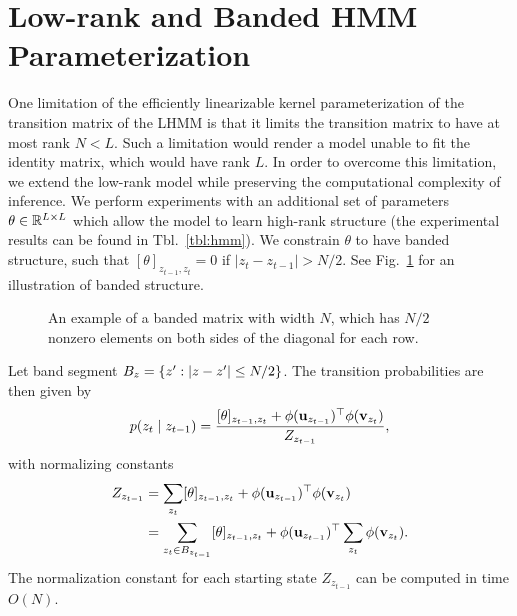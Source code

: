 \documentclass{article}
\begin{document}
\section{Low-rank and Banded HMM Parameterization}
\label{sec:banded}
One limitation of the efficiently linearizable kernel parameterization of the transition matrix of the LHMM is that it limits the transition matrix to have at most rank $N < L$. Such a limitation would render a model unable to fit the identity matrix, which would have rank $L$. 
In order to overcome this limitation, we extend the low-rank model while preserving the computational complexity of inference.
We perform experiments with an additional set of parameters $\theta \in\mathbb{R}^{L\times L}$ which allow the model to learn high-rank structure (the experimental results can be found in Tbl.~\ref{tbl:hmm}).
We constrain $\theta$ to have banded structure,
such that $[\theta]_{z_{t-1},z_t} = 0$ if $|z_t - z_{t-1}| > N/2$.
See Fig.~\ref{fig:banded} for an illustration of banded structure.
\begin{figure}
    \centering
    \caption{An example of a banded matrix with width $N$, which has $N/2$ nonzero elements on both sides of the diagonal for each row.}
    \label{fig:banded}
\end{figure}

Let band segment $B_{z} = \left\{z' : |z - z'| \le N/2\right\}$.
The transition probabilities are then given by
\begin{equation}
    p(z_t \mid z_{t-1}) = \frac{[\theta]_{z_{t-1},z_{t}} + \phi(\mathbf{u}_{z_{t-1}})^\top \phi(\mathbf{v}_{z_{t}})}{Z_{z_{t-1}}},
\end{equation}
with normalizing constants
\begin{equation}
\begin{aligned}
Z_{z_{t-1}}
&= \sum_{z_{t}} [\theta]_{z_{t-1},z_{t}} + \phi(\mathbf{u}_{z_{t-1}})^\top \phi(\mathbf{v}_{z_{t}})\\
&= \sum_{z_{t}\in B_{z_{t-1}}} [\theta]_{z_{t-1},z_{t}} + 
    \phi(\mathbf{u}_{z_{t-1}})^\top \sum_{z_t} \phi(\mathbf{v}_{z_{t}}).
\end{aligned}
\end{equation}
The normalization constant for each starting state $Z_{z_{t-1}}$ can be computed in time $O(N)$.
\end{document}
